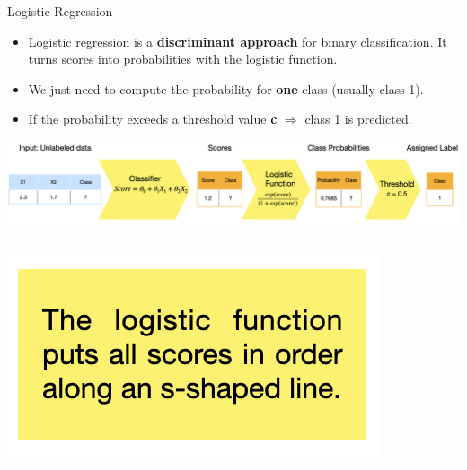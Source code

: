 \documentclass[11pt,compress,t,notes=noshow, xcolor=table]{beamer}
\begin{document}

\begin{vbframe}{Logistic Regression}

\begin{itemize}
\item \small Logistic regression is a \textbf{discriminant approach} for binary classification. It turns scores into probabilities with the logistic function.
\item \small We just need to compute the probability for \textbf{one} class (usually class 1).
\item \small If the probability exceeds a threshold value \textbf{c} $\Rightarrow$ class 1 is predicted.
\end{itemize}

\begin{center}
  \includegraphics[width = 1\textwidth]{figure_man/nutshell-classif-logistic-regression.png}
\end{center}
\begin{columns}
\begin{column}{0.35\textwidth} 
\begin{center}
\includegraphics[width=\textwidth]{figure_man/nutshell-classification-text-box-logisticreg.png}
\end{center}
\end{column}
\begin{column}{0.6\textwidth} 
\begin{center}


\end{center}
\end{column}
\end{columns}
\end{vbframe}
\end{document}
